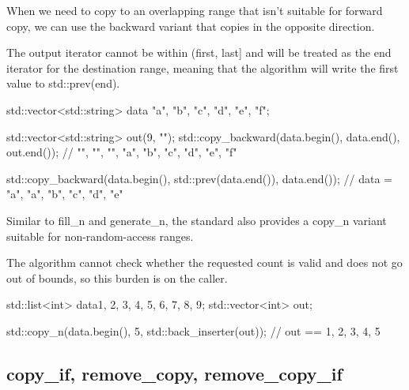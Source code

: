 When we need to copy to an overlapping range that isn’t suitable for forward copy, we can use the backward variant that copies in the opposite direction.



The output iterator cannot be within (first, last] and will be treated as the end iterator for the destination range, meaning that the algorithm will write the first value to std::prev(end).

\begin{box-note}
\begin{cppcode}
std::vector<std::string> data{ "a", "b", "c", "d", "e", "f"};

std::vector<std::string> out(9, "");
std::copy_backward(data.begin(), data.end(), out.end());
// "", "", "", "a", "b", "c", "d", "e", "f"

std::copy_backward(data.begin(), std::prev(data.end()), data.end());
// data = { "a", "a", "b", "c", "d", "e" }
\end{cppcode}
\end{box-note}

Similar to fill\_n and generate\_n, the standard also provides a copy\_n variant suitable for non-random-access ranges.



The algorithm cannot check whether the requested count is valid and does not go out of bounds, so this burden is on the caller.

\begin{box-note}
\begin{cppcode}
std::list<int> data{1, 2, 3, 4, 5, 6, 7, 8, 9};
std::vector<int> out;

std::copy_n(data.begin(), 5, std::back_inserter(out));
// out == { 1, 2, 3, 4, 5 }
\end{cppcode}
\end{box-note}

\subsection{copy\_if, remove\_copy, remove\_copy\_if}

